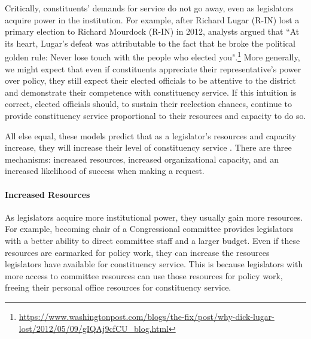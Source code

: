 \documentclass[12pt]{article}
\begin{document}
Critically, constituents' demands for service do not go away, even as legislators acquire power in the institution. For example, after Richard Lugar (R-IN) lost a primary election to Richard Mourdock (R-IN) in 2012, analysts argued that ``At its heart, Lugar's defeat was attributable to the fact that he broke the political golden rule: Never lose touch with the people who elected you".\footnote{\url{https://www.washingtonpost.com/blogs/the-fix/post/why-dick-lugar-lost/2012/05/09/gIQAj9cfCU_blog.html}} %
More generally, we might expect that even if constituents appreciate their representative's power over policy, they still expect their elected officials to be attentive to the district and demonstrate their competence with constituency service. If this intuition is correct, elected officials should, to sustain their reelection chances, continue to provide constituency service proportional to their resources and capacity to do so. %


All else equal, these models predict that as a legislator's resources and capacity increase, they will increase their level of constituency service \cite[Proposition 1]{AshworthBuenodeMesquita2006}. There are three mechanisms: increased resources, increased organizational capacity, and an increased likelihood of success when making a request. 

\paragraph{Increased Resources} As legislators acquire more institutional power, they usually gain more resources. For example, becoming chair of a Congressional committee provides legislators with a better ability to direct committee staff and a larger budget. Even if these resources are earmarked for policy work, they can increase the resources legislators have available for constituency service. This is because legislators with more access to committee resources can use those resources for policy work, freeing their personal office resources for constituency service. 



\end{document}
